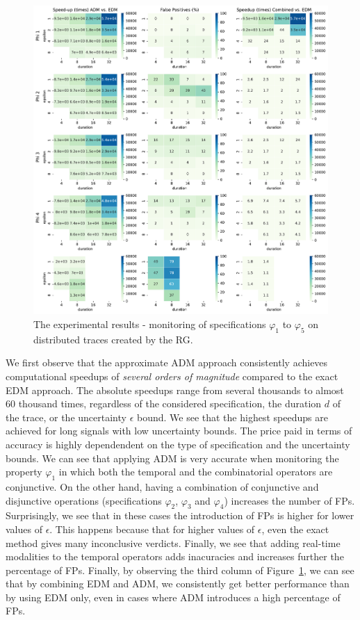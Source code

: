 \begin{figure}
	\begin{center}
	\includegraphics[width=\linewidth]{speedup}
\caption{The experimental results - monitoring of specifications $\varphi_{1}$ to $\varphi_{5}$ on distributed traces created by the RG.}
\label{fig:rgresults}
\end{center}
\end{figure}

We first observe that the approximate ADM approach consistently achieves computational speedups of \emph{several orders of magnitude} 
compared to the exact EDM approach. The absolute speedups range from several thousands to almost 60 thousand times, regardless of the considered specification, the duration $d$ of the trace, or the uncertainty $\epsilon$ bound. We see that the highest speedups are achieved for long signals with low uncertainty bounds. The price paid in terms of accuracy is highly dependendent on the type of specification and the uncertainty bounds. We can see that applying ADM is very accurate when monitoring the property 
$\varphi_1$ in which both the temporal and the combinatorial operators are conjunctive. On the other hand, having a combination of conjunctive and disjunctive operations (specifications $\varphi_{2}$, $\varphi_{3}$ and $\varphi_{4}$) increases the number of FPs.  Surprisingly, we see that in these cases the introduction of FPs is higher for lower values of $\epsilon$. This happens because that for higher values of $\epsilon$,  even the exact method gives many inconclusive verdicts. Finally, we see that adding real-time modalities to the temporal operators adds inacuracies and increases further the percentage of FPs. Finally, by observing the third column of Figure~\ref{fig:rgresults}, we can see that by combining EDM and ADM, we consistently get better performance than by using EDM only, even in cases where ADM introduces a high percentage of FPs.


